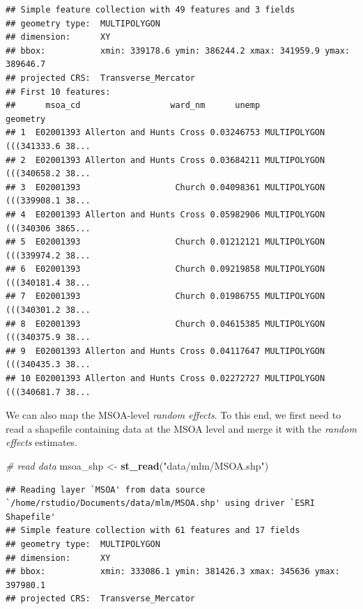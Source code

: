 \documentclass[
]{book}
\newenvironment{Shaded}{\begin{snugshade}}{\end{snugshade}}
\newcommand{\CommentTok}[1]{\textcolor[rgb]{0.56,0.35,0.01}{\textit{#1}}}
\newcommand{\KeywordTok}[1]{\textcolor[rgb]{0.13,0.29,0.53}{\textbf{#1}}}
\newcommand{\NormalTok}[1]{#1}
\newcommand{\OperatorTok}[1]{\textcolor[rgb]{0.81,0.36,0.00}{\textbf{#1}}}
\newcommand{\StringTok}[1]{\textcolor[rgb]{0.31,0.60,0.02}{#1}}
\begin{document}
\begin{verbatim}
## Simple feature collection with 49 features and 3 fields
## geometry type:  MULTIPOLYGON
## dimension:      XY
## bbox:           xmin: 339178.6 ymin: 386244.2 xmax: 341959.9 ymax: 389646.7
## projected CRS:  Transverse_Mercator
## First 10 features:
##      msoa_cd                  ward_nm      unemp                       geometry
## 1  E02001393 Allerton and Hunts Cross 0.03246753 MULTIPOLYGON (((341333.6 38...
## 2  E02001393 Allerton and Hunts Cross 0.03684211 MULTIPOLYGON (((340658.2 38...
## 3  E02001393                   Church 0.04098361 MULTIPOLYGON (((339908.1 38...
## 4  E02001393 Allerton and Hunts Cross 0.05982906 MULTIPOLYGON (((340306 3865...
## 5  E02001393                   Church 0.01212121 MULTIPOLYGON (((339974.2 38...
## 6  E02001393                   Church 0.09219858 MULTIPOLYGON (((340181.4 38...
## 7  E02001393                   Church 0.01986755 MULTIPOLYGON (((340301.2 38...
## 8  E02001393                   Church 0.04615385 MULTIPOLYGON (((340375.9 38...
## 9  E02001393 Allerton and Hunts Cross 0.04117647 MULTIPOLYGON (((340435.3 38...
## 10 E02001393 Allerton and Hunts Cross 0.02272727 MULTIPOLYGON (((340681.7 38...
\end{verbatim}

We can also map the MSOA-level \emph{random effects}. To this end, we first need to read a shapefile containing data at the MSOA level and merge it with the \emph{random effects} estimates.

\begin{Shaded}
\begin{Highlighting}[]
\CommentTok{# read data}
\NormalTok{msoa_shp <-}\StringTok{ }\KeywordTok{st_read}\NormalTok{(}\StringTok{"data/mlm/MSOA.shp"}\NormalTok{)}
\end{Highlighting}
\end{Shaded}

\begin{verbatim}
## Reading layer `MSOA' from data source `/home/rstudio/Documents/data/mlm/MSOA.shp' using driver `ESRI Shapefile'
## Simple feature collection with 61 features and 17 fields
## geometry type:  MULTIPOLYGON
## dimension:      XY
## bbox:           xmin: 333086.1 ymin: 381426.3 xmax: 345636 ymax: 397980.1
## projected CRS:  Transverse_Mercator
\end{verbatim}

\begin{Shaded}
\end{Shaded}
\end{document}
